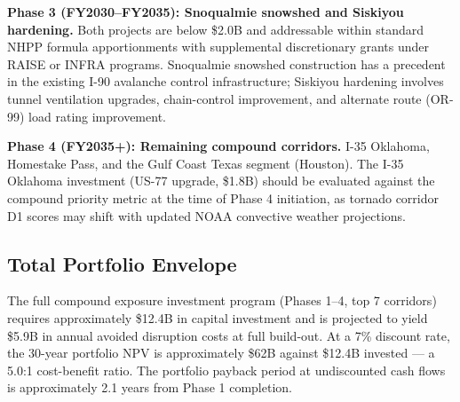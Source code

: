 \textbf{Phase 3 (FY2030--FY2035): Snoqualmie snowshed and Siskiyou hardening.}
Both projects are below \$2.0B and addressable within standard NHPP formula apportionments with supplemental discretionary grants under RAISE or INFRA programs. Snoqualmie snowshed construction has a precedent in the existing I-90 avalanche control infrastructure; Siskiyou hardening involves tunnel ventilation upgrades, chain-control improvement, and alternate route (OR-99) load rating improvement.

\textbf{Phase 4 (FY2035+): Remaining compound corridors.}
I-35 Oklahoma, Homestake Pass, and the Gulf Coast Texas segment (Houston). The I-35 Oklahoma investment (US-77 upgrade, \$1.8B) should be evaluated against the compound priority metric at the time of Phase 4 initiation, as tornado corridor D1 scores may shift with updated NOAA convective weather projections.

\subsection{Total Portfolio Envelope}

The full compound exposure investment program (Phases 1--4, top 7 corridors) requires approximately \$12.4B in capital investment and is projected to yield \$5.9B in annual avoided disruption costs at full build-out. At a 7\% discount rate, the 30-year portfolio NPV is approximately \$62B against \$12.4B invested --- a 5.0:1 cost-benefit ratio. The portfolio payback period at undiscounted cash flows is approximately 2.1 years from Phase 1 completion.

